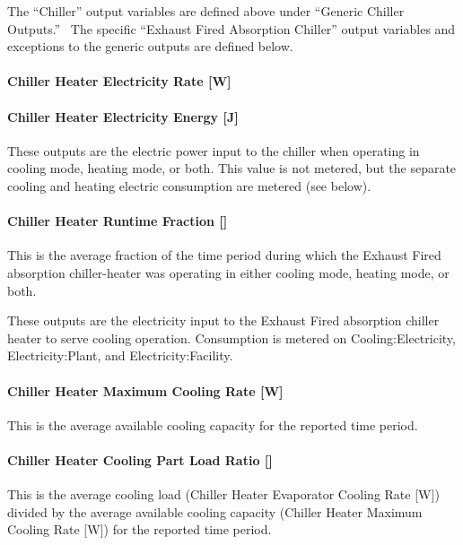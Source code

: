 The ``Chiller'' output variables are defined above under ``Generic Chiller Outputs.''~ The specific ``Exhaust Fired Absorption Chiller'' output variables and exceptions to the generic outputs are defined below.

\paragraph{Chiller Heater Electricity Rate {[}W{]}}\label{chiller-heater-electric-power-w-1}

\paragraph{Chiller Heater Electricity Energy {[}J{]}}\label{chiller-heater-electric-energy-j-1}

These outputs are the electric power input to the chiller when operating in cooling mode, heating mode, or both. This value is not metered, but the separate cooling and heating electric consumption are metered (see below).

\paragraph{Chiller Heater Runtime Fraction {[]}}\label{chiller-heater-runtime-fraction-1}

This is the average fraction of the time period during which the Exhaust Fired absorption chiller-heater was operating in either cooling mode, heating mode, or both.

These outputs are the electricity input to the Exhaust Fired absorption chiller heater to serve cooling operation. Consumption is metered on Cooling:Electricity, Electricity:Plant, and Electricity:Facility.

\paragraph{Chiller Heater Maximum Cooling Rate {[}W{]}}\label{chiller-heater-maximum-cooling-rate-w}

This is the average available cooling capacity for the reported time period.

\paragraph{Chiller Heater Cooling Part Load Ratio {[]}}\label{chiller-heater-cooling-part-load-ratio-1}

This is the average cooling load (Chiller Heater Evaporator Cooling Rate {[}W{]}) divided by the average available cooling capacity (Chiller Heater Maximum Cooling Rate {[}W{]}) for the reported time period.

